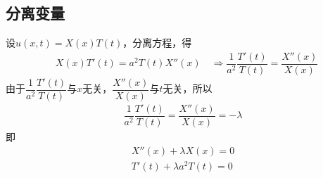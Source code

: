 \subsection{分离变量}
设$u(x, t) = X(x)T(t)$，分离方程，得
\begin{align*}
	 &X(x) T'(t) = a^2 T(t)X''(x)\quad  \Rightarrow \dfrac{1}{a^2} \dfrac{T'(t)}{T(t)} = \dfrac{X''(x)}{X(x)}
\end{align*}
由于$\dfrac{1}{a^2} \dfrac{T'(t)}{T(t)} $与$x$无关，$ \dfrac{X''(x)}{X(x)}$与$t$无关，所以
\begin{align}
	\dfrac{1}{a^2} \dfrac{T'(t)}{T(t)} = \dfrac{X''(x)}{X(x)} = - \lambda
\end{align}
即
\begin{align}
	X''(x) + \lambda X(x) = 0\\
	T'(t) + \lambda a^2 T(t) = 0
\end{align}

